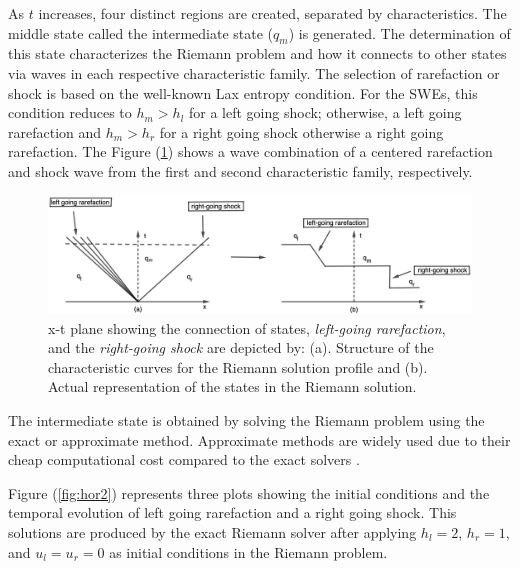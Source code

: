 \documentclass[9pt,a4paper]{article}
\newcommand{\Fig}[1]{Figure (\ref{fig:#1})}
\begin{document}
	As $t$ increases, four distinct regions are created, separated by characteristics. The middle state called the intermediate state ($q_{m}$) is generated.  The determination of this state characterizes the Riemann problem and how it connects to other states via waves in each respective characteristic family.  The selection of rarefaction or shock is based on the well-known Lax entropy condition.   For the SWEs, this condition reduces to $h_m > h_l$ for a left going shock; otherwise, a left going rarefaction and $h_m>h_r$ for a right going shock otherwise a right going rarefaction.    The \Fig{x-tplane} shows a wave combination of a centered rarefaction and shock wave from the first and second characteristic family, respectively.
	
	\begin{figure}[H]
		\centering
		\includegraphics[width=.77\linewidth]{images/geo11}
		\caption{ x-t plane showing the connection of states, {\em left-going rarefaction}, and the {\em right-going shock} are depicted by: (a). Structure of the characteristic curves for the  Riemann solution profile and (b). Actual representation of the states in the Riemann solution.}
		\label{fig:x-tplane}
	\end{figure}
	The intermediate state is obtained by solving the Riemann problem using the exact or approximate method. Approximate methods are widely used due to their cheap computational cost compared to the exact solvers \citep{roe1981approximate}.
	
	
	\Fig{hor2} represents three plots showing the initial conditions and the temporal evolution of left going  rarefaction and a right going shock. This solutions are produced by the exact Riemann solver after applying $h_l = 2$, $h_r = 1$, and $u_l = u_r = 0$ as initial conditions in  the Riemann problem.
	
\end{document}
